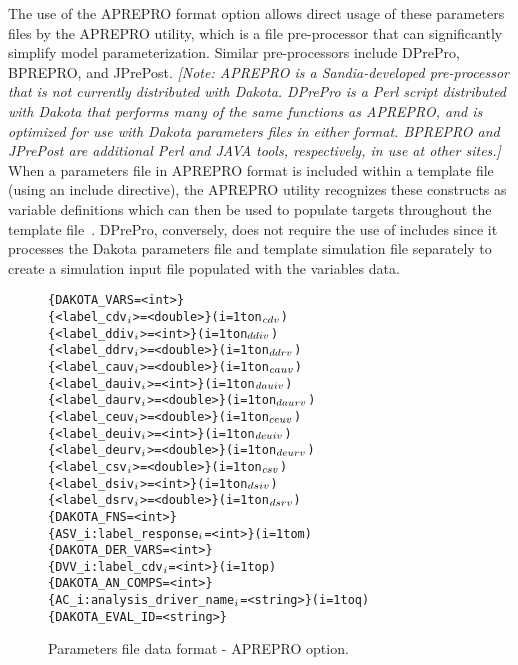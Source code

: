 The use of the APREPRO format option allows direct usage of these
parameters files by the APREPRO utility, which is a file pre-processor
that can significantly simplify model parameterization.  Similar
pre-processors include DPrePro, BPREPRO, and JPrePost.  \emph{[Note:
APREPRO is a Sandia-developed pre-processor that is not currently
distributed with Dakota.  DPrePro is a Perl script distributed with
Dakota that performs many of the same functions as APREPRO, and is
optimized for use with Dakota parameters files in either format.
BPREPRO and JPrePost are additional Perl and JAVA tools, respectively,
in use at other sites.]}  When a parameters file in APREPRO format is
included within a template file (using an include directive), the
APREPRO utility recognizes these constructs as variable definitions
which can then be used to populate targets throughout the template
file~\cite{Sja92}.  DPrePro, conversely, does not require the use of
includes since it processes the Dakota parameters file and template
simulation file separately to create a simulation input file populated
with the variables data.

\begin{figure}
  \begin{bigbox}
  \centering
  \begin{alltt}
    \{ DAKOTA_VARS = <int> \}
    \{ <label_cdv\(\sb{i}\)> = <double> \}         (i = 1 to n\(\sb{cdv}\))
    \{ <label_ddiv\(\sb{i}\)> = <int> \}           (i = 1 to n\(\sb{ddiv}\))
    \{ <label_ddrv\(\sb{i}\)> = <double> \}        (i = 1 to n\(\sb{ddrv}\))
    \{ <label_cauv\(\sb{i}\)> = <double> \}        (i = 1 to n\(\sb{cauv}\))
    \{ <label_dauiv\(\sb{i}\)> = <int> \}          (i = 1 to n\(\sb{dauiv}\))
    \{ <label_daurv\(\sb{i}\)> = <double> \}       (i = 1 to n\(\sb{daurv}\))
    \{ <label_ceuv\(\sb{i}\)> = <double> \}        (i = 1 to n\(\sb{ceuv}\))
    \{ <label_deuiv\(\sb{i}\)> = <int> \}          (i = 1 to n\(\sb{deuiv}\))
    \{ <label_deurv\(\sb{i}\)> = <double> \}       (i = 1 to n\(\sb{deurv}\))
    \{ <label_csv\(\sb{i}\)> = <double> \}         (i = 1 to n\(\sb{csv}\))
    \{ <label_dsiv\(\sb{i}\)> = <int> \}           (i = 1 to n\(\sb{dsiv}\))
    \{ <label_dsrv\(\sb{i}\)> = <double> \}        (i = 1 to n\(\sb{dsrv}\)) \color{blue}
    \{ DAKOTA_FNS = <int> \}
    \{ ASV_i:label_response\(\sb{i}\) = <int> \}              (i = 1 to m) \color{red}
    \{ DAKOTA_DER_VARS = <int> \}
    \{ DVV_i:label_cdv\(\sb{i}\) = <int> \}                   (i = 1 to p) \color{green}
    \{ DAKOTA_AN_COMPS = <int> \}
    \{ AC_i:analysis_driver_name\(\sb{i}\) = <string> \}      (i = 1 to q)
    \{ DAKOTA_EVAL_ID = <string> \}
  \end{alltt}
  \end{bigbox}
  \caption{Parameters file data format - APREPRO option.}
  \label{variables:figure02}
\end{figure}

